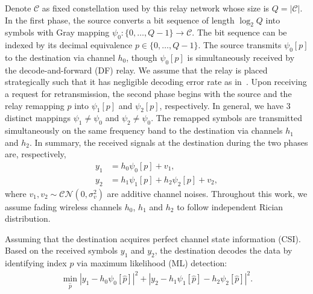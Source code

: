 \documentclass[journal,draftcls,onecolumn,12pt,twoside]{IEEEtran}
\begin{document}
Denote $\mathcal{C}$ as fixed constellation used by this relay network whose
size is $Q = |\mathcal{C}|$. In the first phase, the source converts a bit
sequence of length $\log_2Q$ into symbols with Gray mapping $\psi_0:
\{0,\ldots,Q - 1\}\rightarrow \mathcal{C}$. The bit sequence can be indexed by
its decimal equivalence $p\in \{0,\ldots,Q - 1\}$. The source transmits
$\psi_0[p]$ to the destination via channel $h_0$, though $\psi_0[p]$ is
simultaneously received by the decode-and-forward (DF) relay. We assume that the
relay is placed strategically such that it has negligible decoding error rate as
in~\cite{ryu2011ber, kim2009design}. Upon receiving a request for
retransmission, the second phase begins with the source and the relay remapping
$p$ into $\psi_1[p]$ and $\psi_2[p]$, respectively. In general, we have 3
distinct mappings $\psi_1\not=\psi_0$ and $\psi_2\not=\psi_0$. The remapped
symbols are transmitted simultaneously on the same frequency band to the
destination via channels $h_1$ and $h_2$. In summary, the received signals at
the destination during the two phases are, respectively,
\begin{subequations}
    \begin{align}
       y_1 & = h_0\psi_0[p] + v_1, \\
       y_2 & = h_1\psi_1[p] + h_2\psi_2[p] + v_2,
    \end{align}
\end{subequations}
where $v_1, v_2\sim\mathcal{CN}(0,\sigma_v^2)$ are additive channel noises.
Throughout this work, we assume fading wireless channels $h_0$, $h_1$ and $h_2$ 
to follow independent Rician distribution.

Assuming that the destination acquires perfect channel state information (CSI).
Based on the received symbols $y_1$ and $y_2$,  the destination decodes the data
by identifying index $p$ via maximum likelihood (ML) detection:
\begin{align}
    \min_{\hat{p}} |y_1 - h_0\psi_0[\hat{p}]|^2 + |y_2-
    h_1\psi_1[\hat{p}] - h_2\psi_2[\hat{p}]|^2.
    \label{eq:ML}
\end{align}

%
%
\end{document}
